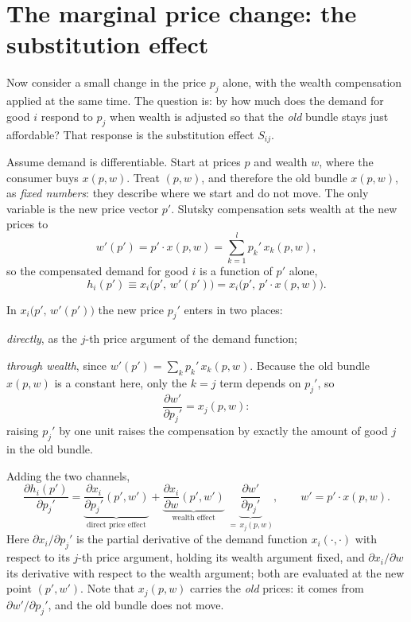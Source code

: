 \documentclass[11pt]{article}
\begin{document}
\section{The marginal price change: the substitution effect}

Now consider a small change in the price $p_j$ alone, with the wealth compensation
applied at the same time. The question is: by how much does the demand for good $i$
respond to $p_j$ when wealth is adjusted so that the \emph{old} bundle stays just
affordable? That response is the substitution effect $S_{ij}$.

Assume demand is differentiable. Start at prices $p$ and wealth $w$, where the
consumer buys $x(p,w)$. Treat
$(p,w)$, and therefore the old bundle $x(p,w)$, as \emph{fixed numbers}: they
describe where we start and do not move. The only variable is the new price vector
$p'$. Slutsky compensation sets wealth at the new prices to
\[ w'(p')=p'\cdot x(p,w)=\sum_{k=1}^{l}p_k'\,x_k(p,w), \]
so the compensated demand for good $i$ is a function of $p'$ alone,
\[ h_i(p')\equiv x_i\bigl(p',\,w'(p')\bigr)=x_i\bigl(p',\,p'\cdot x(p,w)\bigr). \]

In $x_i\bigl(p',\,w'(p')\bigr)$ the new price $p_j'$ enters in two places:
\begin{flatnum}
  \item \emph{directly}, as the $j$-th price argument of the demand function;
  \item \emph{through wealth}, since $w'(p')=\sum_k p_k'\,x_k(p,w)$. Because the old
        bundle $x(p,w)$ is a constant here, only the $k=j$ term depends on $p_j'$,
        so
        \[ \frac{\partial w'}{\partial p_j'}=x_j(p,w): \]
        raising $p_j'$ by one unit raises the compensation by exactly the amount of
        good $j$ in the old bundle.
\end{flatnum}

Adding the two channels,
\[
  \frac{\partial h_i(p')}{\partial p_j'}
  =\underbrace{\frac{\partial x_i}{\partial p_j'}(p',w')}_{\text{direct price effect}}
   +\underbrace{\frac{\partial x_i}{\partial w}(p',w')}_{\text{wealth effect}}\;
    \underbrace{\frac{\partial w'}{\partial p_j'}}_{=\,x_j(p,w)} ,
  \qquad w'=p'\cdot x(p,w).
\]
Here $\partial x_i/\partial p_j'$ is the partial derivative of the demand function
$x_i(\cdot,\cdot)$ with respect to its $j$-th price argument, holding its wealth
argument fixed, and $\partial x_i/\partial w$ its derivative with respect to the
wealth argument; both are evaluated at the new point $(p',w')$. Note that
$x_j(p,w)$ carries the \emph{old} prices: it comes from $\partial w'/\partial p_j'$,
and the old bundle does not move.
\end{document}
